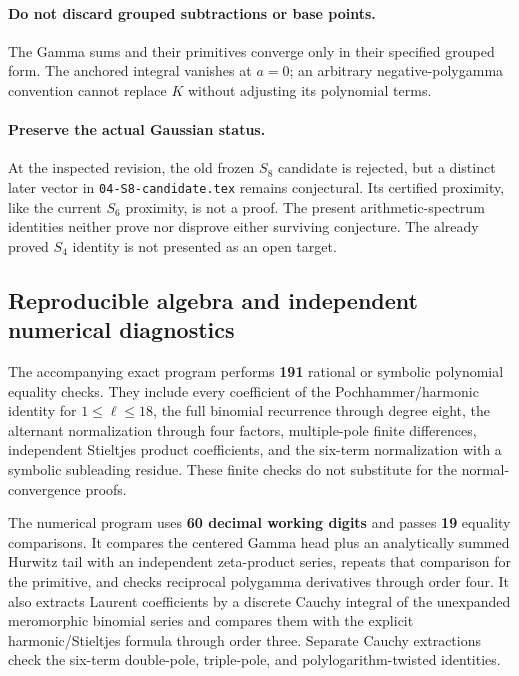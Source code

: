 \documentclass[11pt]{article}
\numberwithin{equation}{section}
\theoremstyle{definition}\newtheorem{definition}[theorem]{Definition}
\theoremstyle{remark}\newtheorem{remark}[theorem]{Remark}\newtheorem{example}[theorem]{Example}
\begin{document}
\paragraph{Do not discard grouped subtractions or base points.}
The Gamma sums and their primitives converge only in their specified
grouped form. The anchored integral vanishes at $a=0$; an arbitrary
negative-polygamma convention cannot replace $K$ without adjusting
its polynomial terms.

\paragraph{Preserve the actual Gaussian status.}
At the inspected revision, the old frozen $S_8$ candidate is rejected,
but a distinct later vector in \texttt{04-S8-candidate.tex} remains
conjectural. Its certified proximity, like the current $S_6$ proximity,
is not a proof. The present arithmetic-spectrum identities neither
prove nor disprove either surviving conjecture. The already proved
$S_4$ identity is not presented as an open target.

\subsection{Reproducible algebra and independent numerical diagnostics}
The accompanying exact program performs \textbf{191} rational or symbolic
polynomial equality checks. They include every coefficient of the
Pochhammer/harmonic identity for $1\le\ell\le18$, the full binomial
recurrence through degree eight, the alternant normalization through
four factors, multiple-pole finite differences, independent Stieltjes
product coefficients, and the six-term normalization with a symbolic
subleading residue. These finite checks do not substitute for the
normal-convergence proofs.

The numerical program uses \textbf{60 decimal working digits} and passes
\textbf{19} equality comparisons. It compares the centered Gamma head
plus an analytically summed Hurwitz tail with an independent zeta-product
series, repeats that comparison for the primitive, and checks reciprocal
polygamma derivatives through order four. It also extracts Laurent
coefficients by a discrete Cauchy integral of the unexpanded meromorphic
binomial series and compares them with the explicit harmonic/Stieltjes
formula through order three. Separate Cauchy extractions check the
six-term double-pole, triple-pole, and polylogarithm-twisted identities.
\end{document}
